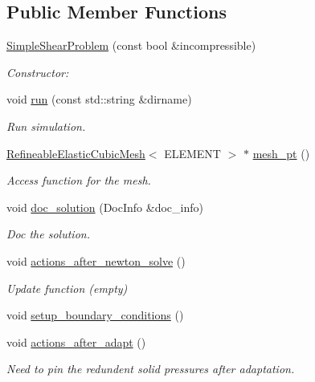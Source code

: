 \subsection*{Public Member Functions}
\begin{DoxyCompactItemize}
\item 
\hyperlink{classSimpleShearProblem_ada0881781b3332f88362528be39613d2}{Simple\+Shear\+Problem} (const bool \&incompressible)
\begin{DoxyCompactList}\small\item\em Constructor\+: \end{DoxyCompactList}\item 
void \hyperlink{classSimpleShearProblem_ac1746a2634e310571d40d70719d509c0}{run} (const std\+::string \&dirname)
\begin{DoxyCompactList}\small\item\em Run simulation. \end{DoxyCompactList}\item 
\hyperlink{classRefineableElasticCubicMesh}{Refineable\+Elastic\+Cubic\+Mesh}$<$ E\+L\+E\+M\+E\+NT $>$ $\ast$ \hyperlink{classSimpleShearProblem_a2f13119c6c66305a6bde6945434a8f10}{mesh\+\_\+pt} ()
\begin{DoxyCompactList}\small\item\em Access function for the mesh. \end{DoxyCompactList}\item 
void \hyperlink{classSimpleShearProblem_a24c087d9ea194229930bcf9f889a048e}{doc\+\_\+solution} (Doc\+Info \&doc\+\_\+info)
\begin{DoxyCompactList}\small\item\em Doc the solution. \end{DoxyCompactList}\item 
void \hyperlink{classSimpleShearProblem_ab476064967687537e335dfd40d770dbc}{actions\+\_\+after\+\_\+newton\+\_\+solve} ()
\begin{DoxyCompactList}\small\item\em Update function (empty) \end{DoxyCompactList}\item 
void \hyperlink{classSimpleShearProblem_a17449af62f8025e2b03ddb922b47016d}{setup\+\_\+boundary\+\_\+conditions} ()
\item 
void \hyperlink{classSimpleShearProblem_a9b493680096cdbccb0cfa18b35787165}{actions\+\_\+after\+\_\+adapt} ()
\begin{DoxyCompactList}\small\item\em Need to pin the redundent solid pressures after adaptation. \end{DoxyCompactList}\item 

\end{DoxyCompactItemize}

